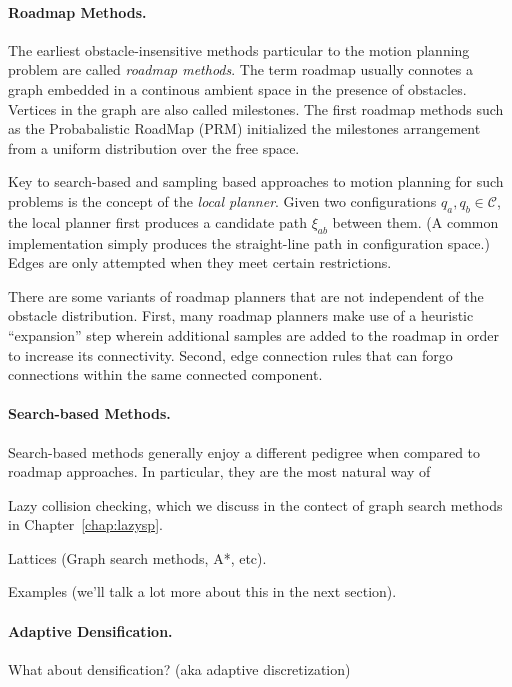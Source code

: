 \paragraph{Roadmap Methods.}

The earliest obstacle-insensitive methods particular to the motion
planning problem are called \emph{roadmap methods}.
The term roadmap usually connotes a graph embedded in a continous
ambient space in the presence of obstacles.
Vertices in the graph are also called milestones.
The first roadmap methods such as the
Probabalistic RoadMap (PRM) \citep{kavrakietal1996prm}
initialized the milestones arrangement
from a uniform distribution over the free space.

Key to search-based and sampling based approaches
to motion planning for such problems
is the concept of the \emph{local planner}.
Given two configurations $q_a, q_b \in \mathcal{C}$,
the local planner first produces a candidate path $\xi_{ab}$ between
them.
(A common implementation simply produces the straight-line path
in configuration space.)
Edges are only attempted when they meet certain restrictions.

There are some variants of roadmap planners that are not independent
of the obstacle distribution.
First,
many roadmap planners make use of a heuristic ``expansion'' step
wherein additional samples are added to the roadmap
in order to increase its connectivity.
Second,
edge connection rules that can forgo connections within
the same connected component.


\paragraph{Search-based Methods.}
Search-based methods generally enjoy a different pedigree
when compared to roadmap approaches.
In particular,
they are the most natural way of 

Lazy collision checking,
which we discuss in the contect of graph search methods
in Chapter~\ref{chap:lazysp}.

Lattices (Graph search methods, A*, etc).

Examples (we'll talk a lot more about this in the next section).

\paragraph{Adaptive Densification.}
What about densification? (aka adaptive discretization)

